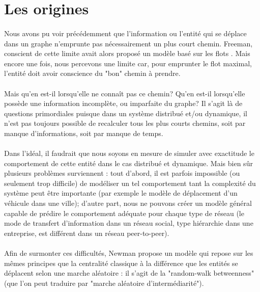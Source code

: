 \documentclass[a4paper, 10pt]{report}
\begin{document}
	\section{Les origines}

\paragraph{}Nous avons pu voir précédemment que l'information ou l'entité qui se déplace dans un graphe n'emprunte pas nécessairement un plus court chemin. Freeman, conscient de cette limite avait alors proposé un modèle basé sur les flots \cite{FreemanBorgattiWhite1991Centrality}. Mais encore une fois, nous percevons une limite car, pour emprunter le flot maximal, l'entité doit avoir conscience du "bon" chemin à prendre. 

\paragraph{}Mais qu'en est-il lorsqu'elle ne connaît pas ce chemin? Qu'en est-il lorsqu'elle possède une information incomplète, ou imparfaite du graphe? Il s'agit là de questions primordiales puisque dans un système distribué et/ou dynamique, il n'est pas toujours possible de recalculer tous les plus courts chemins, soit par manque d'informations, soit par manque de temps.

\paragraph{}Dans l'idéal, il faudrait que nous soyons en mesure de simuler avec exactitude le comportement de cette entité dans le cas distribué et dynamique. Mais bien sûr plusieurs problèmes surviennent : tout d'abord, il est parfois impossible (ou seulement trop difficile) de modéliser un tel comportement tant la complexité du système peut être importante (par exemple le modèle de déplacement d'un véhicule dans une ville); d'autre part, nous ne pouvons créer un modèle général capable de prédire le comportement adéquate pour chaque type de réseau (le mode de transfert d'information dans un réseau social, type hiérarchie dans une entreprise, est différent dans un réseau peer-to-peer).
    
\paragraph{}Afin de surmonter ces difficultés, Newman propose un modèle qui repose sur les mêmes principes que la centralité classique à la différence que les entités se déplacent selon une marche aléatoire \cite{Newman2005MeasureBetweenness} : il s'agit de la "random-walk betweenness" (que l'on peut traduire par "marche aléatoire d'intermédiarité").
\end{document}
